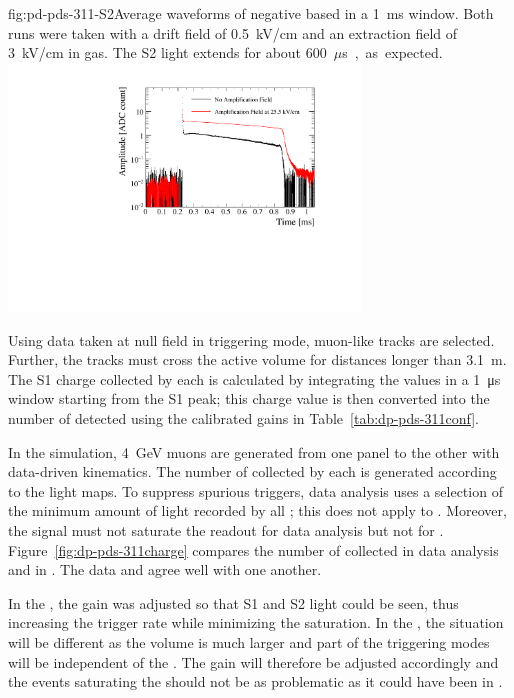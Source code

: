 \begin{dunefigure}{fig:pd-pds-311-S2}{Average waveforms of negative based  in a \SI{1}{ms} window. Both runs were taken with a drift field of \SI{0.5}{kV/cm} and an extraction field of \SI{3}{kV/cm} in gas. The S2 light extends for about \SI{600}{$\mu$s}, as expected.}
\includegraphics[width=0.7\textwidth]{graphics/dppd_311_S2_extraction.pdf}
\end{dunefigure}
Using data taken at null field in  triggering mode, muon-like tracks are selected. Further, the tracks must cross the active volume for distances longer than \SI{3.1}{\m}. 
The S1 charge collected by each  is calculated by integrating the  values in a \SI{1}{\us} window starting from the S1 peak; this charge value is then converted into the number of detected  using the calibrated  gains in Table~\ref{tab:dp-pds-311conf}.

In the simulation, \SI{4}{\GeV} muons are generated from one  panel to the other with data-driven kinematics. The number of  collected by each  is generated according to the light maps. To suppress spurious triggers, data analysis uses a selection of the minimum amount of light recorded by all ; this does not apply to . Moreover, the  signal must not saturate the readout %
for data analysis but not for . Figure~\ref{fig:dp-pds-311charge} compares the number of  collected in data analysis and in . The data and  agree well with one another. 

In the , the  gain was adjusted so that S1 and S2 light could be seen, thus increasing the trigger rate while minimizing the   saturation. 
In the , the situation will be different as the volume is much larger and part of the triggering modes will be independent of the . 
The  gain will therefore be adjusted accordingly and the events saturating the  should not be as problematic as it could have been in .

